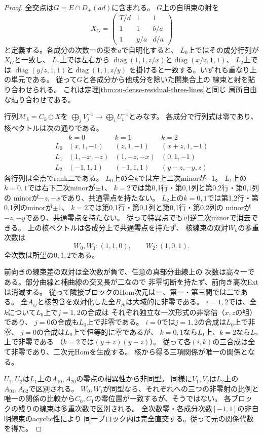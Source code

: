 \begin{proof}
全交点は$G=E\cap D_+(ad)$に含まれる。
$G$上の自明束の射を
\[
 X_G=\begin{pmatrix}T/d&1&1\\1&1&b/a\\1&y/a&d/a\end{pmatrix}
\]
と定義する。各成分の次数一の束を$a$で自明化すると、
$L_0$上ではその成分行列が$X_G$と一致し、
$L_1$上では左右から
$\operatorname{diag}(1,1,z/x)$と$\operatorname{diag}(x/z,1,1)$、
$L_2$上では
$\operatorname{diag}(y/z,1,1)$と$\operatorname{diag}(1,1,z/y)$
を掛けると一致する。いずれも重なり上の単元である。
従って$G$と各成分から他成分を除いた開集合上の
線束と射を貼り合わせられる。
これは定理\ref{thm:ou-dense-residual-three-lines}と同じ
局所自由な貼り合わせである。

行列$\mathscr M_k=C_k\odot X$を
$\bigoplus_j V_j^{-1}\to\bigoplus_i U_i^{-1}$とみなす。
各成分で行列式は零であり、核ベクトルは次の通りである。
\[
\begin{array}{c|ccc}
 &k=0&k=1&k=2\\ \hline
 L_0&(x,1,-1)&(z,1,-1)&(x+z,1,-1)\\
 L_1&(1,-x,-z)&(1,-z,-x)&(0,1,-1)\\
 L_2&(-1,1,1)&(-1,1,1)&(y-z,-y,z)
\end{array}
\]
各行列は全点でrank二である。
$L_0$上の全$k$では左上二次minorが$-1$。
$L_1$上の$k=0,1$では右下二次minorが$\pm1$、
$k=2$では第0,1行・第0,1列と第0,2行・第0,1列の
minorが$-z,-x$であり、共通零点を持たない。
$L_2$上の$k=0,1$では第1,2行・第0,1列のminorが$\pm1$、
$k=2$では第0,1行・第0,1列と第0,1行・第0,2列の
minorが$-z,-y$であり、共通零点を持たない。
従って特異点でも可逆二次minorで消去できる。
上の核ベクトルは各成分上で共通零点を持たず、
核線束の双対$W_k$の多重次数は
\[
 W_0,W_1:(1,1,0),\qquad W_2:(1,0,1).
\]
全次数は所望の$0,1,2$である。

前向きの線束差の双対は全次数が負で、任意の真部分曲線上の
次数は高々一である。部分曲線と補曲線の交叉長が二なので
非零切断を持たず、前向き高次Extは消滅する。
従って隣接ブロックのHom次元は一、第一・第三間では二である。
全$A_{ij}$と核包含を双対化した全$B_{jk}$は大域的に非零である。
$i=1,2$では、全$k$について$L_0$上で$j=1,2$の合成は
それぞれ独立な一次形式の非零倍（$x,z$の組）であり、
$j=0$の合成も$L_0$上で非零である。
$i=0$では$j=1,2$の合成は$L_0$上で非零、
$j=0$の合成は$L_0$上で恒等的に零であるが、
$k=0,1$なら$L_1$上、$k=2$なら$L_2$上で非零である
（$k=2$では$(y+z)(y-z)$）。
従って各$(i,k)$の三合成は全て非零であり、二次元Homを生成する。
核から得る三項関係が唯一の関係となる。

$U_1,U_2$は$L_1$上の$A_{10},A_{20}$の零点の相異性から非同型。
同様に$V_1,V_2$は$L_2$上の$A_{01},A_{02}$で区別される。
$W_0,W_1$が同型なら、それぞれへの三つの非零射の比例と
唯一の関係の比較から$C_0,C_1$の零位置が一致するが、そうではない。
各ブロックの残りの線束は多重次数で区別される。
全次数零・各成分次数$[-1,1]$の非自明線束のacyclic性により
同一ブロック内は完全直交する。従って元の関係代数を得た。


\end{proof}
